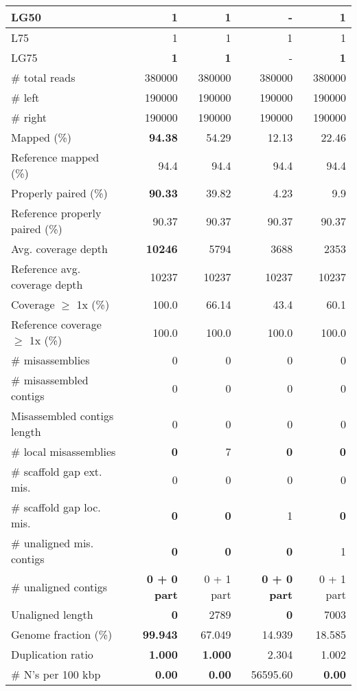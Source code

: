 \documentclass[12pt,a4paper]{article}
\begin{document}
\begin{table}[ht]
\begin{center}
\begin{tabular}{|l*{4}{|r}|}
LG50 & {\bf 1} & {\bf 1} & - & {\bf 1} \\ \hline
L75 & 1 & 1 & 1 & 1 \\ \hline
LG75 & {\bf 1} & {\bf 1} & - & {\bf 1} \\ \hline
\# total reads & 380000 & 380000 & 380000 & 380000 \\ \hline
\# left & 190000 & 190000 & 190000 & 190000 \\ \hline
\# right & 190000 & 190000 & 190000 & 190000 \\ \hline
Mapped (\%) & {\bf 94.38} & 54.29 & 12.13 & 22.46 \\ \hline
Reference mapped (\%) & 94.4 & 94.4 & 94.4 & 94.4 \\ \hline
Properly paired (\%) & {\bf 90.33} & 39.82 & 4.23 & 9.9 \\ \hline
Reference properly paired (\%) & 90.37 & 90.37 & 90.37 & 90.37 \\ \hline
Avg. coverage depth & {\bf 10246} & 5794 & 3688 & 2353 \\ \hline
Reference avg. coverage depth & 10237 & 10237 & 10237 & 10237 \\ \hline
Coverage $\geq$ 1x (\%) & 100.0 & 66.14 & 43.4 & 60.1 \\ \hline
Reference coverage $\geq$ 1x (\%) & 100.0 & 100.0 & 100.0 & 100.0 \\ \hline
\# misassemblies & 0 & 0 & 0 & 0 \\ \hline
\# misassembled contigs & 0 & 0 & 0 & 0 \\ \hline
Misassembled contigs length & 0 & 0 & 0 & 0 \\ \hline
\# local misassemblies & {\bf 0} & 7 & {\bf 0} & {\bf 0} \\ \hline
\# scaffold gap ext. mis. & 0 & 0 & 0 & 0 \\ \hline
\# scaffold gap loc. mis. & {\bf 0} & {\bf 0} & 1 & {\bf 0} \\ \hline
\# unaligned mis. contigs & {\bf 0} & {\bf 0} & {\bf 0} & 1 \\ \hline
\# unaligned contigs & {\bf 0 + 0 part} & 0 + 1 part & {\bf 0 + 0 part} & 0 + 1 part \\ \hline
Unaligned length & {\bf 0} & 2789 & {\bf 0} & 7003 \\ \hline
Genome fraction (\%) & {\bf 99.943} & 67.049 & 14.939 & 18.585 \\ \hline
Duplication ratio & {\bf 1.000} & {\bf 1.000} & 2.304 & 1.002 \\ \hline
\# N's per 100 kbp & {\bf 0.00} & {\bf 0.00} & 56595.60 & {\bf 0.00} \\ \hline

\end{tabular}
\end{center}
\end{table}
\end{document}
